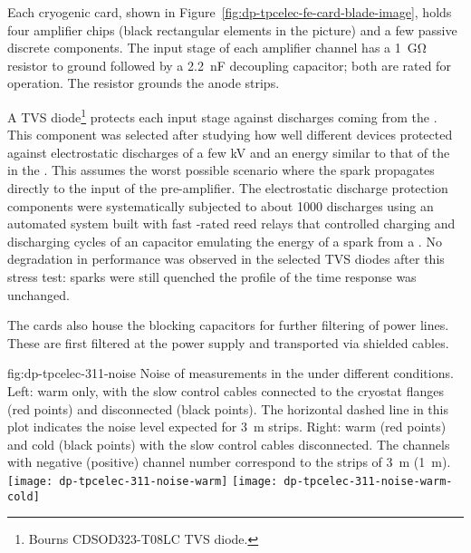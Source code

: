 Each cryogenic  card, shown in Figure~\ref{fig:dp-tpcelec-fe-card-blade-image}, holds four  amplifier chips (black rectangular elements in the picture) and a few passive discrete components. The input stage of each amplifier channel has a \SI{1}{\giga\ohm} resistor to ground followed by a \SI{2.2}{\nano\farad} decoupling capacitor; both are rated for  operation. The resistor grounds the  anode strips. 

A TVS diode\footnote{Bourns\texttrademark{} CDSOD323-T08LC TVS diode.} protects each input stage against discharges coming from the . This component was selected after studying how well different devices protected against electrostatic discharges of a few \si{kV} and an energy similar to that of the  in the . This assumes the worst possible scenario where the spark propagates directly to the input of the pre-amplifier. The electrostatic discharge protection components were systematically subjected to about \num{1000} discharges using an automated system built with fast -rated reed relays that controlled charging and discharging cycles of an  capacitor emulating the energy of a spark from a . No degradation in performance was observed in the selected TVS diodes after this stress test: sparks were still quenched the profile of the time response was unchanged.

The  cards also house the blocking capacitors for further filtering of  power lines. These are first filtered at the power supply and transported via shielded cables.


\begin{dunefigure}{fig:dp-tpcelec-311-noise}
{Noise of measurements in the  under different conditions. Left: warm only,  with the slow control cables connected to the cryostat flanges (red points) and disconnected (black points). The horizontal dashed line in this plot indicates the noise level expected for \SI{3}{\meter} strips. Right: warm (red points) and cold (black points) with the slow control cables disconnected. The channels with negative (positive) channel number correspond to the strips of \SI{3}{\meter} (\SI{1}{\meter}).}
\texttt{[image: dp-tpcelec-311-noise-warm]}
\texttt{[image: dp-tpcelec-311-noise-warm-cold]}
\end{dunefigure}


